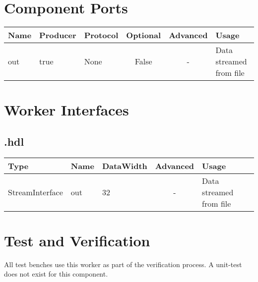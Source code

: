 \begin{landscape}
	\section*{Component Ports}
	\begin{scriptsize}
\begin{tabular}{|M{2cm}|M{1.5cm}|M{4cm}|c|c|M{9cm}|}
\hline
{}
Name & Producer & Protocol & Optional & Advanced & Usage
\\
\hline
out & true & None& False & - & Data streamed from file\\
\hline
\end{tabular}
	\end{scriptsize}

	\section*{Worker Interfaces}
	\subsection*{\comp.hdl}
	\begin{scriptsize}
\begin{tabular}{|M{2cm}|M{1.5cm}|M{4cm}|c|M{12cm}|}
\hline
{}
Type & Name & DataWidth & Advanced & Usage
\\
\hline
StreamInterface & out & 32 & - & Data streamed from file\\
\hline
\end{tabular}
	\end{scriptsize}
\end{landscape}

\section*{Test and Verification}
\begin{flushleft}
All test benches use this worker as part of the verification process. A unit-test does not exist for this component.
\end{flushleft}

